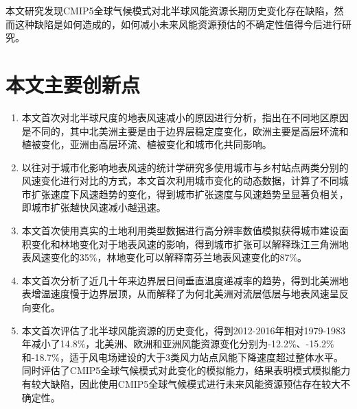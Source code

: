 本文研究发现CMIP5全球气候模式对北半球风能资源长期历史变化存在缺陷，然而这种缺陷是如何造成的，如何减小未来风能资源预估的不确定性值得今后进行研究。

\section{本文主要创新点}

\begin{enumerate}

\item 本文首次对北半球尺度的地表风速减小的原因进行分析，指出在不同地区原因是不同的，其中北美洲主要是由于边界层稳定度变化，欧洲主要是高层环流和植被变化，亚洲由高层环流、植被变化和城市化共同影响。

\item 以往对于城市化影响地表风速的统计学研究多使用城市与乡村站点两类分别的风速变化进行对比的方式，本文首次利用城市变化的动态数据，计算了不同城市扩张速度下风速趋势的变化，得到城市扩张速度与风速趋势呈显著负相关，即城市扩张越快风速减小越迅速。

\item 本文首次使用真实的土地利用类型数据进行高分辨率数值模拟获得城市建设面积变化和林地变化对于地表风速的影响，得到城市扩张可以解释珠江三角洲地表风速变化的35\%，林地变化可以解释南芬兰地表风速变化的87\%。

\item 本文首次分析了近几十年来边界层日间垂直温度递减率的趋势，得到北美洲地表增温速度慢于边界层顶，从而解释了为何北美洲对流层低层与地表风速呈反向变化。

\item 本文首次评估了北半球风能资源的历史变化，得到2012-2016年相对1979-1983年减小了14.8\%，北美洲、欧洲和亚洲风能资源变化分别为-12.2\%、-15.2\%和-18.7\%，适于风电场建设的大于3类风力站点风能下降速度超过整体水平。同时评估了CMIP5全球气候模式对此变化的模拟能力，结果表明模式模拟能力有较大缺陷，因此使用CMIP5全球气候模式进行未来风能资源预估存在较大不确定性。

\end{enumerate}